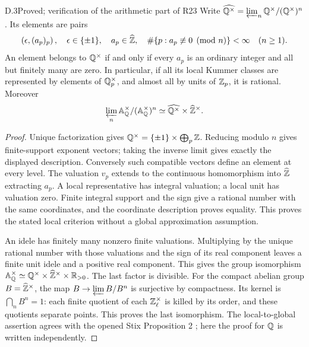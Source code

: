 \begin{claim}{D.3}{Proved; verification of the arithmetic part of R23}
Write $\widehat{\mathbb Q^\times}=\varprojlim_n\mathbb Q^\times/(\mathbb Q^\times)^n$.
Its elements are pairs
\[
 \left(\epsilon,(a_p)_p\right),\quad
 \epsilon\in\{\pm1\},\quad a_p\in\widehat{\mathbb Z},
 \quad\#\{p:a_p\not\equiv0\pmod n\}<\infty\quad(n\geq1).
\]
An element belongs to $\mathbb Q^\times$ if and only if every $a_p$ is an
ordinary integer and all but finitely many are zero. In particular,
if all its local Kummer classes are represented by elements of
$\mathbb Q_p^\times$, and almost all by units of $\mathbb Z_p$, it is rational.
Moreover
\[
 \varprojlim_n\mathbb A_\mathbb Q^\times/(\mathbb A_\mathbb Q^\times)^n
       \simeq\widehat{\mathbb Q^\times}\times\widehat{\mathbb Z}^{\times}.
\]
\end{claim}
\begin{proof}
Unique factorization gives
$\mathbb Q^\times=\{\pm1\}\times\bigoplus_p\mathbb Z$.
Reducing modulo $n$ gives finite-support exponent vectors; taking
the inverse limit gives exactly the displayed description. Conversely
such compatible vectors define an element at every level. The
valuation $v_p$ extends to the continuous homomorphism into
$\widehat{\mathbb Z}$ extracting $a_p$. A local representative has integral
valuation; a local unit has valuation zero. Finite integral support
and the sign give a rational number with the same coordinates, and
the coordinate description proves equality. This proves the stated
local criterion without a global approximation assumption.

An idele has finitely many nonzero finite valuations. Multiplying
by the unique rational number with those valuations and the sign of
its real component leaves a finite unit idele and a positive real
component. This gives the group isomorphism
$\mathbb A_\mathbb Q^\times\simeq
\mathbb Q^\times\times\widehat{\mathbb Z}^\times\times\mathbb R_{>0}$.
The last factor is divisible. For the compact abelian group
$B=\widehat{\mathbb Z}^\times$, the map $B\to\varprojlim B/B^n$ is
surjective by compactness. Its kernel is $\bigcap_n B^n=1$:
each finite quotient of each $\mathbb Z_\ell^\times$ is killed by its
order, and these quotients separate points. This proves the last
isomorphism. The local-to-global assertion agrees with the opened
Stix Proposition 2 \citep{D_Stix2015}; here the proof for $\mathbb Q$ is
written independently.
\end{proof}

